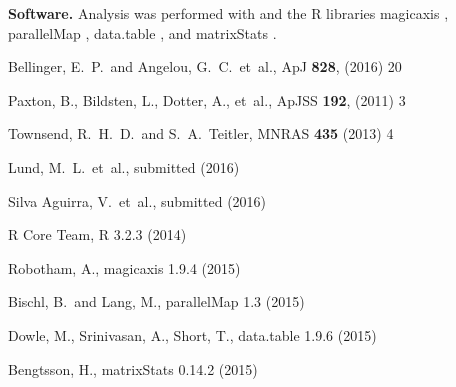 \documentclass[epj,twocolumn]{webofc}
\begin{document}
\textbf{Software.} Analysis was performed with  \citep{R} and the R libraries magicaxis  \citep{magicaxis}, parallelMap  \citep{parallelMap}, data.table  \citep{data.table}, and matrixStats  \citep{matrixStats}.
%
\begin{thebibliography}{}
Bellinger, E.~P.~and Angelou, G.~C.~{et~al.}, ApJ \textbf{828}, (2016) 20

Paxton, B., Bildsten, L., Dotter, A., {et~al.}, ApJSS \textbf{192}, (2011) 3

Townsend, R.~H.~D.~and S.~A.~Teitler, MNRAS \textbf{435} (2013) 4

Lund, M.~L.~{et~al.}, submitted (2016)

Silva Aguirra, V.~{et~al.}, submitted (2016)

{R Core Team}, R 3.2.3 (2014)

Robotham, A., magicaxis 1.9.4 (2015)

Bischl, B.~and Lang, M., parallelMap 1.3 (2015)

Dowle, M., Srinivasan, A., Short, T., data.table 1.9.6 (2015)

Bengtsson, H., matrixStats 0.14.2 (2015)
\end{thebibliography}
\end{document}
